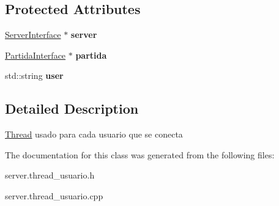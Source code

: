 \subsection*{Protected Attributes}
\begin{DoxyCompactItemize}
\item 
\hypertarget{classThreadUsuario_ab778e6d6893a51191a76cc4a7f45938b}{\hyperlink{classServerInterface}{Server\-Interface} $\ast$ {\bfseries server}}\label{classThreadUsuario_ab778e6d6893a51191a76cc4a7f45938b}

\item 
\hypertarget{classThreadUsuario_a161d5b28cdbd8116969bf698ebec11c3}{\hyperlink{classPartidaInterface}{Partida\-Interface} $\ast$ {\bfseries partida}}\label{classThreadUsuario_a161d5b28cdbd8116969bf698ebec11c3}

\item 
\hypertarget{classThreadUsuario_a513f404350b08bee0b09b0291869a660}{std\-::string {\bfseries user}}\label{classThreadUsuario_a513f404350b08bee0b09b0291869a660}

\end{DoxyCompactItemize}


\subsection{Detailed Description}
\hyperlink{classThread}{Thread} usado para cada usuario que se conecta 

The documentation for this class was generated from the following files\-:\begin{DoxyCompactItemize}
\item 
server.\-thread\-\_\-usuario.\-h\item 
server.\-thread\-\_\-usuario.\-cpp\end{DoxyCompactItemize}

